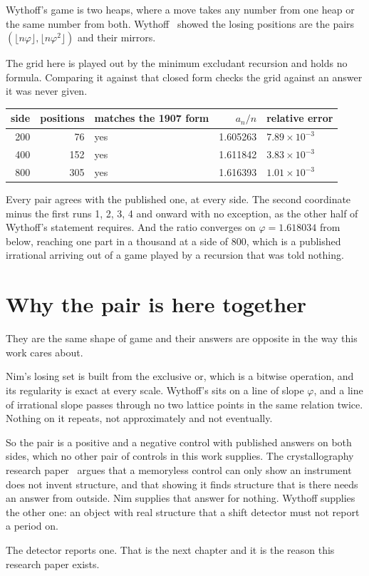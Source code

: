 Wythoff's game is two heaps, where a move takes any number from one heap or the same number from
both. Wythoff~\cite{src:Wythoff-1907} showed the losing positions are the pairs
\(\left(\lfloor n\varphi \rfloor, \lfloor n\varphi^{2} \rfloor\right)\) and their mirrors.

The grid here is played out by the minimum excludant recursion and holds no formula. Comparing it
against that closed form checks the grid against an answer it was never given.

\begin{center}
\begin{tabular}{@{}rrlrl@{}}
\toprule
side & positions & matches the 1907 form & \(a_n/n\) & relative error \\
\midrule
200 & 76 & yes & 1.605263 & \(7.89\times10^{-3}\) \\
400 & 152 & yes & 1.611842 & \(3.83\times10^{-3}\) \\
800 & 305 & yes & 1.616393 & \(1.01\times10^{-3}\) \\
\bottomrule
\end{tabular}
\end{center}

Every pair agrees with the published one, at every side. The second coordinate minus the first runs
1, 2, 3, 4 and onward with no exception, as the other half of Wythoff's statement requires. And the
ratio converges on \(\varphi = 1.618034\) from below, reaching one part in a thousand at a side of
800, which is a published irrational arriving out of a game played by a recursion that was told
nothing.

\section{Why the pair is here together}

They are the same shape of game and their answers are opposite in the way this work cares about.

Nim's losing set is built from the exclusive or, which is a bitwise operation, and its regularity is
exact at every scale. Wythoff's sits on a line of slope \(\varphi\), and a line of irrational slope
passes through no two lattice points in the same relation twice. Nothing on it repeats, not
approximately and not eventually.

So the pair is a positive and a negative control with published answers on both sides, which no
other pair of controls in this work supplies. The crystallography research paper~\cite{src:Quigg-crystallography} argues that a memoryless control
can only show an instrument does not invent structure, and that showing it finds structure that is
there needs an answer from outside. Nim supplies that answer for nothing. Wythoff supplies the other
one: an object with real structure that a shift detector must not report a period on.

The detector reports one. That is the next chapter and it is the reason this research paper exists.
